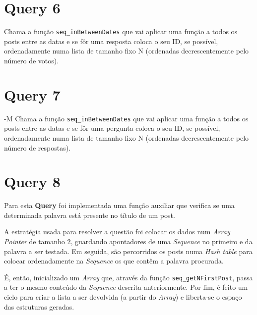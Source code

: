 \documentclass[a4paper]{report}
\begin{document}
	\section{Query 6}
	\tab Chama a função \verb+seq_inBetweenDates+ que vai aplicar uma função a todos os posts entre as datas e  se fôr uma resposta coloca o seu ID, se possível, ordenadamente numa lista de tamanho fixo N (ordenadas decrescentemente pelo número de votos).

	\section{Query 7} -M
	\tab Chama a função \verb+seq_inBetweenDates+ que vai aplicar uma função a todos os posts entre as datas e  se fôr uma pergunta coloca o seu ID, se possível, ordenadamente numa lista de tamanho fixo N (ordenadas decrescentemente pelo número de respostas).

	\section{Query 8}
	\tab Para esta \textbf{Query} foi implementada uma função auxiliar que verifica se uma determinada palavra está presente no título de um post. \par
	A estratégia usada para resolver a questão foi colocar os dados num  \textit{Array Pointer} de tamanho 2, guardando apontadores de uma \textit{Sequence} no primeiro e da palavra a ser testada. Em seguida, são percorridos os posts numa \textit{Hash table} para colocar ordenadamente na \textit{Sequence} os que contêm a palavra procurada. \par
	É, então, inicializado um \textit{Array} que, através da função \verb+seq_getNFirstPost+, passa a ter o mesmo conteúdo da \textit{Sequence} descrita anteriormente. Por fim, é feito um ciclo para criar a lista a ser devolvida (a partir do \textit{Array}) e liberta-se o espaço das estruturas geradas.
\end{document}
